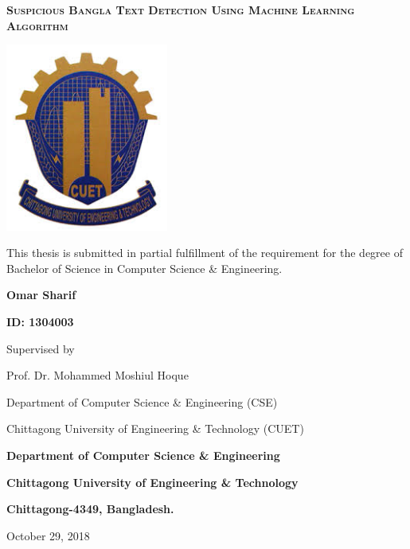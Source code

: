 \begin{titlepage}
	\centering
	{\scshape\Large\bfseries Suspicious Bangla Text Detection Using Machine Learning Algorithm \par}
	\vspace{1cm}
	\includegraphics[width=0.4\textwidth]{Figures/Logo.jpeg}\par\vspace{1cm}
	\vspace{1cm}
	 This thesis is submitted in partial fulfillment of the requirement for the degree of Bachelor of Science in Computer Science \& Engineering.
	
	\vspace{2cm}
	\textbf{Omar Sharif}\par 
	\vspace{.5cm}
	\textbf{ID: 1304003}\par 
	
	\vspace{2cm}
	Supervised by\par 
	Prof. Dr. Mohammed Moshiul Hoque\par 
	Department of Computer Science \& Engineering (CSE)\par 
	Chittagong University of Engineering \& Technology (CUET)
	
	\vspace{1.5cm}
	{\Large\bfseries Department of Computer Science \& Engineering\par}
	{\large\bfseries Chittagong University of Engineering \& Technology\par}
	{\bfseries Chittagong-4349, Bangladesh.}

	\vfill
	{\large October 29, 2018\par}
\end{titlepage}

\setcounter{secnumdepth}{-1}


